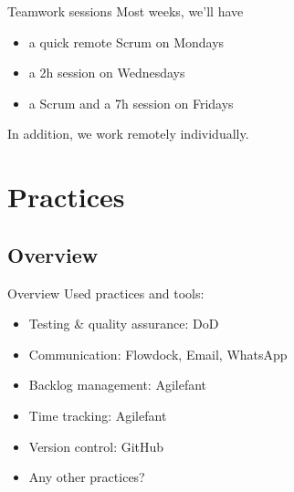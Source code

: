 \documentclass{beamer}
\begin{document}
\begin{frame}{Teamwork sessions}
  Most weeks, we'll have

  \begin{itemize}
  \item a quick remote Scrum on Mondays
  \item a 2h session on Wednesdays
  \item a Scrum and a 7h session on Fridays
  \end{itemize}

  In addition, we work remotely individually.
\end{frame}
\section{Practices} %
\subsection{Overview}
\begin{frame}{Overview}
  Used practices and tools:

  \begin{itemize}
  \item Testing \& quality assurance: DoD
  \item Communication: Flowdock, Email, WhatsApp
  \item Backlog management: Agilefant
  \item Time tracking: Agilefant
  \item Version control: GitHub
  \item Any other practices?
  \end{itemize}
\end{frame}
\end{document}
